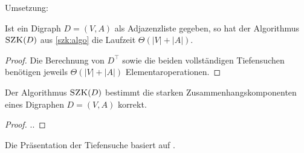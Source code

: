 \begin{bem} Umsetzung: 

\end{bem} 

\begin{thm}
	\label{thm:starke-zshgk-laufzeit}
	Ist ein Digraph $D=(V,A)$ als Adjazenzliste gegeben, so hat der Algorithmus $\mathop{\text{\textsc{SZK}}}(D)$ aus \ref{szk:algo} die Laufzeit $\Theta(|V|+|A|)$.
\end{thm}
\begin{proof}
	Die Berechnung von $D^\top$ sowie die beiden vollständigen Tiefensuchen benötigen jeweils  $\Theta(|V|+|A|)$ Elementaroperationen. 
\end{proof}


\begin{thm}
Der Algorithmus $\mathop{\text{\textsc{SZK}}}(D)$ bestimmt die starken Zusammenhangskomponenten eines Digraphen $D=(V,A)$ korrekt.
\end{thm}
\begin{proof}
..
\end{proof}


\begin{bem}
	Die Präsentation der Tiefensuche basiert auf  \cite{CLRS17}.
\end{bem} 
